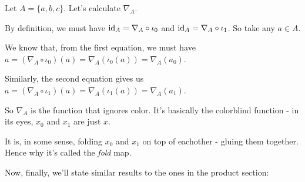 \begin{ex}
	Let $A=\{a,b,c\}$. Let's calculate $\nabla_A$.
	
	By definition, we must have ${\rm id}_A=\nabla_A\circ\iota_0$ and ${\rm id}_A=\nabla_A\circ\iota_1$. So take any $a\in A$.
	
	We know that, from the first equation, we must have $a=(\nabla_A\circ\iota_0)(a)=\nabla_A(\iota_0(a))=\nabla_A(a_0)$.
	
	Similarly, the second equation gives us $a=(\nabla_A\circ\iota_1)(a)=\nabla_A(\iota_1(a))=\nabla_A(a_1)$.
	
	So $\nabla_A$ is the function that ignores color. It's basically the colorblind function - in its eyes, $x_0$ and $x_1$ are just $x$.
	
	It is, in some sense, folding $x_0$ and $x_1$ on top of eachother - gluing them together. Hence why it's called the \textit{fold} map.
\end{ex}

Now, finally, we'll state similar results to the ones in the product section:

